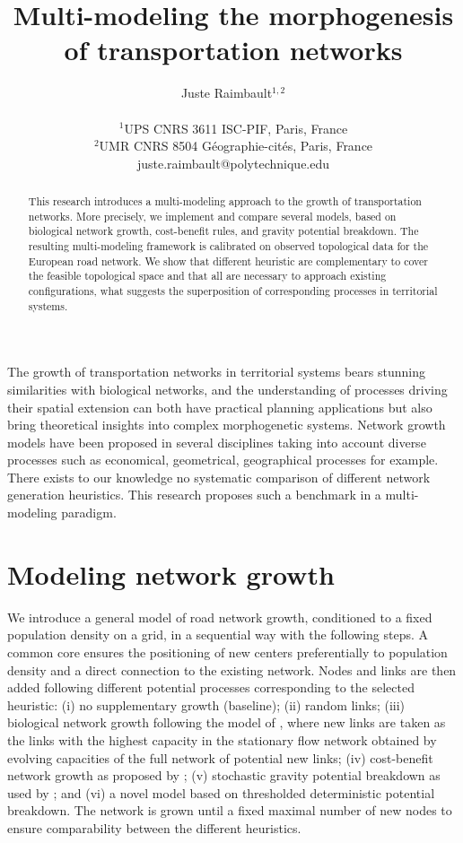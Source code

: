 \documentclass[letterpaper]{article}
\title{Multi-modeling the morphogenesis of transportation networks}
\author{Juste Raimbault$^{1,2}$\\
\mbox{}\\
$^1$UPS CNRS 3611 ISC-PIF, Paris, France \\
$^2$UMR CNRS 8504 G{\'e}ographie-cit{\'e}s, Paris, France \\
juste.raimbault@polytechnique.edu} %
\begin{document}
\maketitle

\begin{abstract}
This research introduces a multi-modeling approach to the growth of transportation networks. More precisely, we implement and compare several models, based on biological network growth, cost-benefit rules, and gravity potential breakdown. The resulting multi-modeling framework is calibrated on observed topological data for the European road network. We show that different heuristic are complementary to cover the feasible topological space and that all are necessary to approach existing configurations, what suggests the superposition of corresponding processes in territorial systems.
\end{abstract}



The growth of transportation networks in territorial systems bears stunning similarities with biological networks, and the understanding of processes driving their spatial extension can both have practical planning applications but also bring theoretical insights into complex morphogenetic systems. Network growth models have been proposed in several disciplines \citep{xie2009modeling} taking into account diverse processes such as economical, geometrical, geographical processes for example. There exists to our knowledge no systematic comparison of different network generation heuristics. This research proposes such a benchmark in a multi-modeling paradigm.


\section{Modeling network growth}

We introduce a general model of road network growth, conditioned to a fixed population density on a grid, in a sequential way with the following steps. A common core ensures the positioning of new centers preferentially to population density and a direct connection to the existing network. Nodes and links are then added following different potential processes corresponding to the selected heuristic: (i) no supplementary growth (baseline); (ii) random links; (iii) biological network growth following the model of \cite{tero2010rules}, where new links are taken as the links with the highest capacity in the stationary flow network obtained by evolving capacities of the full network of potential new links; (iv) cost-benefit network growth as proposed by \cite{louf2013emergence}; (v) stochastic gravity potential breakdown as used by \cite{schmitt2014modelisation}; and (vi) a novel model based on thresholded deterministic potential breakdown. The network is grown until a fixed maximal number of new nodes to ensure comparability between the different heuristics.
\end{document}
